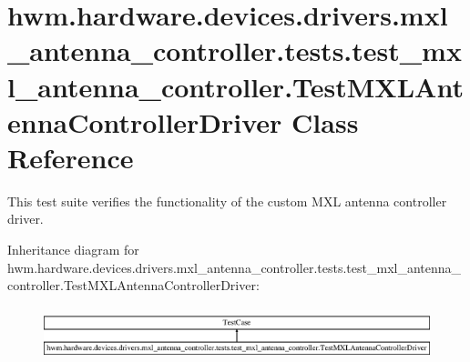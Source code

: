 \hypertarget{classhwm_1_1hardware_1_1devices_1_1drivers_1_1mxl__antenna__controller_1_1tests_1_1test__mxl__an2edaee9f18a9d6c35832076cf9ff4beb}{\section{hwm.\-hardware.\-devices.\-drivers.\-mxl\-\_\-antenna\-\_\-controller.\-tests.\-test\-\_\-mxl\-\_\-antenna\-\_\-controller.\-Test\-M\-X\-L\-Antenna\-Controller\-Driver Class Reference}
\label{classhwm_1_1hardware_1_1devices_1_1drivers_1_1mxl__antenna__controller_1_1tests_1_1test__mxl__an2edaee9f18a9d6c35832076cf9ff4beb}
}


This test suite verifies the functionality of the custom M\-X\-L antenna controller driver.  


Inheritance diagram for hwm.\-hardware.\-devices.\-drivers.\-mxl\-\_\-antenna\-\_\-controller.\-tests.\-test\-\_\-mxl\-\_\-antenna\-\_\-controller.\-Test\-M\-X\-L\-Antenna\-Controller\-Driver\-:\begin{figure}[H]
\begin{center}
\leavevmode
\includegraphics[height=1.570827cm]{classhwm_1_1hardware_1_1devices_1_1drivers_1_1mxl__antenna__controller_1_1tests_1_1test__mxl__an2edaee9f18a9d6c35832076cf9ff4beb}
\end{center}
\end{figure}
